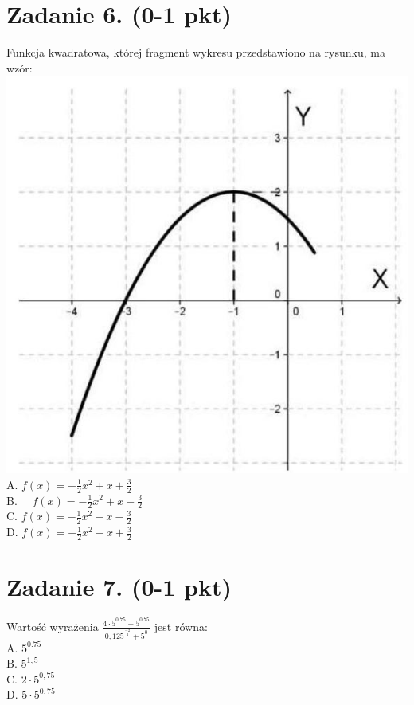 \documentclass[10pt]{article}
\begin{document}
\section*{Zadanie 6. (0-1 pkt)}
Funkcja kwadratowa, której fragment wykresu przedstawiono na rysunku, ma wzór:\\
\includegraphics[max width=\textwidth, center]{2024_11_21_b8ac5f500a5bbb1b4ec5g-04(3)}\\
A. \(f(x)=-\frac{1}{2} x^{2}+x+\frac{3}{2}\)\\
B. \(\quad f(x)=-\frac{1}{2} x^{2}+x-\frac{3}{2}\)\\
C. \(f(x)=-\frac{1}{2} x^{2}-x-\frac{3}{2}\)\\
D. \(f(x)=-\frac{1}{2} x^{2}-x+\frac{3}{2}\)

\section*{Zadanie 7. (0-1 pkt)}
Wartość wyrażenia \(\frac{4 \cdot 5^{0.75}+5^{0.75}}{0,125^{\frac{-2}{3}}+5^{0}}\) jest równa:\\
A. \(5^{0.75}\)\\
B. \(5^{1,5}\)\\
C. \(2 \cdot 5^{0,75}\)\\
D. \(5 \cdot 5^{0,75}\)
\end{document}
